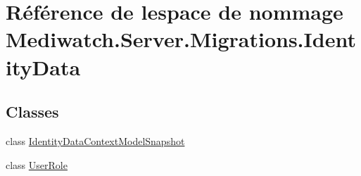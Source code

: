 \hypertarget{namespace_mediwatch_1_1_server_1_1_migrations_1_1_identity_data}{}\section{Référence de l\textquotesingle{}espace de nommage Mediwatch.\+Server.\+Migrations.\+Identity\+Data}
\label{namespace_mediwatch_1_1_server_1_1_migrations_1_1_identity_data}
\subsection*{Classes}
\begin{DoxyCompactItemize}
\item 
class \hyperlink{class_mediwatch_1_1_server_1_1_migrations_1_1_identity_data_1_1_identity_data_context_model_snapshot}{Identity\+Data\+Context\+Model\+Snapshot}
\item 
class \hyperlink{class_mediwatch_1_1_server_1_1_migrations_1_1_identity_data_1_1_user_role}{User\+Role}
\end{DoxyCompactItemize}
